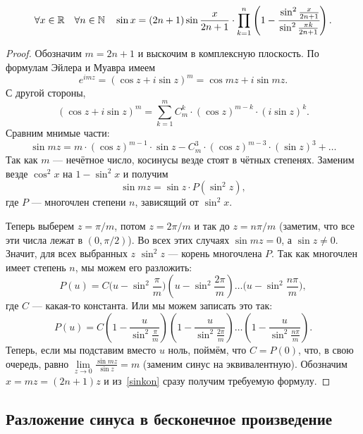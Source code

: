 \begin{lemma} \hypertarget{sinlem}{}
	\[
		\forall x \in \mathbb{R} \quad \forall n \in \mathbb{N} \quad \sin x = (2n + 1) \sin \frac{x}{2n + 1} \cdot \prod_{k=1}^{n} \left(1 - \cfrac{\sin^2 \frac{x}{2n + 1}}{\sin^2 \frac{\pi k}{2n + 1}} \right).
	\]
\end{lemma}
\begin{proof}
	Обозначим \(m = 2n + 1\) и выскочим в комплексную плоскость. По формулам Эйлера и Муавра имеем \[
	e^{i m z} = (\cos z + i \sin z)^m = \cos mz + i \sin mz.
	\]
	С другой стороны, \[
	(\cos z + i \sin z)^m = \sum_{k=1}^{m} C_m^k \cdot (\cos z)^{m-k} \cdot (i \sin z)^k.
	\]
	Сравним мнимые части: \[
	\sin mz = m \cdot (\cos z)^{m-1} \cdot \sin z - C_m^3 \cdot (\cos z)^{m-3} \cdot (\sin z)^3 + \ldots
	\]
	Так как \(m\) --- нечётное число, косинусы везде стоят в чётных степенях. Заменим везде \(\cos^2 x\) на \(1 - \sin^2 x\) и получим
	\begin{equation} \label{sinkon}
		\sin mz = \sin z \cdot P(\sin^2 z),
	\end{equation}
	где \(P\) --- многочлен степени \(n\), зависящий от \(\sin^2 x\).
	
	Теперь выберем \(z = \pi/m\), потом \(z = 2\pi/m\) и так до \(z = n\pi/m\) (заметим, что все эти числа лежат в \((0, \pi/2)\)). Во всех этих случаях \(\sin mz = 0\), а \(\sin z \neq 0\). Значит, для всех выбранных \(z\) \(\sin^2 z\) --- корень многочлена \(P\). Так как многочлен имеет степень \(n\), мы можем его разложить: \[
	P(u) = C \bigg(u - \sin^2 \frac{\pi}{m} \bigg) \left(u - \sin^2 \frac{2 \pi}{m} \right) \ldots \bigg(u - \sin^2 \frac{n \pi}{m} \bigg),
	\]
	где \(C\) --- какая-то константа. Или мы можем записать это так: \[
	P(u) = C \left(1 - \frac{u}{\sin^2 \frac{\pi}{m}} \right) \left(1 - \frac{u}{\sin^2 \frac{2 \pi}{m}} \right) \ldots  \left(1 - \frac{u}{\sin^2 \frac{n \pi}{m}} \right).
	\]
	Теперь, если мы подставим вместо \(u\) ноль, поймём, что \(C = P(0)\), что, в свою очередь, равно \(\lim\limits_{z \to 0} \frac{\sin mz}{\sin z} = m\) (заменим синус на эквивалентную). Обозначим \(x = mz = (2n + 1) z\) и из~\eqref{sinkon} сразу получим требуемую формулу.
\end{proof}

\subsection{Разложение синуса в бесконечное произведение}

